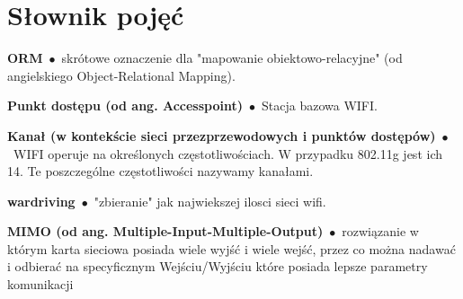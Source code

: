 \chapter*{Słownik pojęć}

\newcommand{\entry}[2]{\textbf{#1}\ $\bullet$\ {#2}}

\entry{ORM}{skrótowe oznaczenie dla "mapowanie obiektowo-relacyjne" (od angielskiego Object-Relational Mapping).}

\entry{Punkt dostępu (od ang. Accesspoint)}{Stacja bazowa WIFI.}

\entry{Kanał (w kontekście sieci przezprzewodowych i punktów dostępów)}{WIFI operuje na określonych częstotliwościach. W przypadku 802.11g jest ich 14. Te poszczególne częstotliwości nazywamy kanałami.}

\entry{wardriving}{"zbieranie" jak najwiekszej ilosci sieci wifi.}

\entry{MIMO (od ang. Multiple-Input-Multiple-Output)}{rozwiązanie w którym karta sieciowa posiada wiele wyjść i wiele wejść, przez co można nadawać i odbierać na specyficznym Wejściu/Wyjściu które posiada lepsze parametry komunikacji}


